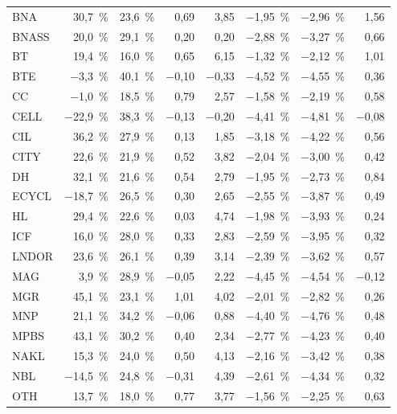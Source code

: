 \begin{longtable}{lrrrrrrr}
BNA & 30{,}7~\% & 23{,}6~\% & 0{,}69 & 3{,}85 & $-$1{,}95~\% & $-$2{,}96~\% & 1{,}56 \\
BNASS & 20{,}0~\% & 29{,}1~\% & 0{,}20 & 0{,}20 & $-$2{,}88~\% & $-$3{,}27~\% & 0{,}66 \\
BT & 19{,}4~\% & 16{,}0~\% & 0{,}65 & 6{,}15 & $-$1{,}32~\% & $-$2{,}12~\% & 1{,}01 \\
BTE & $-$3{,}3~\% & 40{,}1~\% & $-$0{,}10 & $-$0{,}33 & $-$4{,}52~\% & $-$4{,}55~\% & 0{,}36 \\
CC & $-$1{,}0~\% & 18{,}5~\% & 0{,}79 & 2{,}57 & $-$1{,}58~\% & $-$2{,}19~\% & 0{,}58 \\
CELL & $-$22{,}9~\% & 38{,}3~\% & $-$0{,}13 & $-$0{,}20 & $-$4{,}41~\% & $-$4{,}81~\% & $-$0{,}08 \\
CIL & 36{,}2~\% & 27{,}9~\% & 0{,}13 & 1{,}85 & $-$3{,}18~\% & $-$4{,}22~\% & 0{,}56 \\
CITY & 22{,}6~\% & 21{,}9~\% & 0{,}52 & 3{,}82 & $-$2{,}04~\% & $-$3{,}00~\% & 0{,}42 \\
DH & 32{,}1~\% & 21{,}6~\% & 0{,}54 & 2{,}79 & $-$1{,}95~\% & $-$2{,}73~\% & 0{,}84 \\
ECYCL & $-$18{,}7~\% & 26{,}5~\% & 0{,}30 & 2{,}65 & $-$2{,}55~\% & $-$3{,}87~\% & 0{,}49 \\
HL & 29{,}4~\% & 22{,}6~\% & 0{,}03 & 4{,}74 & $-$1{,}98~\% & $-$3{,}93~\% & 0{,}24 \\
ICF & 16{,}0~\% & 28{,}0~\% & 0{,}33 & 2{,}83 & $-$2{,}59~\% & $-$3{,}95~\% & 0{,}32 \\
LNDOR & 23{,}6~\% & 26{,}1~\% & 0{,}39 & 3{,}14 & $-$2{,}39~\% & $-$3{,}62~\% & 0{,}57 \\
MAG & 3{,}9~\% & 28{,}9~\% & $-$0{,}05 & 2{,}22 & $-$4{,}45~\% & $-$4{,}54~\% & $-$0{,}12 \\
MGR & 45{,}1~\% & 23{,}1~\% & 1{,}01 & 4{,}02 & $-$2{,}01~\% & $-$2{,}82~\% & 0{,}26 \\
MNP & 21{,}1~\% & 34{,}2~\% & $-$0{,}06 & 0{,}88 & $-$4{,}40~\% & $-$4{,}76~\% & 0{,}48 \\
MPBS & 43{,}1~\% & 30{,}2~\% & 0{,}40 & 2{,}34 & $-$2{,}77~\% & $-$4{,}23~\% & 0{,}40 \\
NAKL & 15{,}3~\% & 24{,}0~\% & 0{,}50 & 4{,}13 & $-$2{,}16~\% & $-$3{,}42~\% & 0{,}38 \\
NBL & $-$14{,}5~\% & 24{,}8~\% & $-$0{,}31 & 4{,}39 & $-$2{,}61~\% & $-$4{,}34~\% & 0{,}32 \\
OTH & 13{,}7~\% & 18{,}0~\% & 0{,}77 & 3{,}77 & $-$1{,}56~\% & $-$2{,}25~\% & 0{,}63 \\

\end{longtable}

